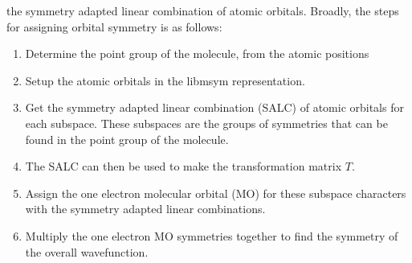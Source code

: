 the symmetry adapted linear combination of atomic orbitals. Broadly, the steps
for assigning orbital symmetry is as follows:
\begin{enumerate}
    \item Determine the point group of the molecule, from the atomic positions
    \item Setup the atomic orbitals in the libmsym representation.
    \item Get the symmetry adapted linear combination (SALC) of atomic orbitals for 
    each subspace. These subspaces are the groups of symmetries that can be found
    in the point group of the molecule.
    \item The SALC can then be used to make the transformation matrix $T$.
    \item Assign the one electron molecular orbital (MO) for these subspace characters
     with the symmetry adapted linear combinations.
    \item Multiply the one electron MO symmetries together to find the symmetry 
    of the overall wavefunction.
\end{enumerate}

